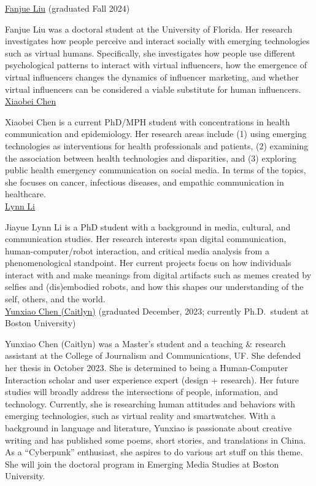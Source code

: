\documentclass[]{article}
\begin{document}
\href{https://www.fanjueliu.com/}{Fanjue Liu} (graduated Fall 2024)

Fanjue Liu was a doctoral student at the University of Florida. Her
research investigates how people perceive and interact socially with
emerging technologies such as virtual humans. Specifically, she
investigates how people use different psychological patterns to interact
with virtual influencers, how the emergence of virtual influencers
changes the dynamics of influencer marketing, and whether virtual
influencers can be considered a viable substitute for human
influencers.\\

\href{https://www.linkedin.com/in/xiaobei-chen/}{Xiaobei Chen}

Xiaobei Chen is a current PhD/MPH student with concentrations in health
communication and epidemiology. Her research areas include (1) using
emerging technologies as interventions for health professionals and
patients, (2) examining the association between health technologies and
disparities, and (3) exploring public health emergency communication on
social media. In terms of the topics, she focuses on cancer, infectious
diseases, and empathic communication in healthcare.\\

\href{https://www.jou.ufl.edu/staff/jiayue-lynn-li/}{Lynn Li}

Jiayue Lynn Li is a PhD student with a background in media, cultural,
and communication studies. Her research interests span digital
communication, human-computer/robot interaction, and critical media
analysis from a phenomenological standpoint. Her current projects focus
on how individuals interact with and make meanings from digital
artifacts such as memes created by selfies and (dis)embodied robots, and
how this shapes our understanding of the self, others, and the world.\\

\href{https://www.linkedin.com/in/yunxiao-caitlyn-chen-133413178/}{Yunxiao
Chen (Caitlyn)} (graduated December, 2023; currently Ph.D.~student at
Boston University)

Yunxiao Chen (Caitlyn) was a Master's student and a teaching \& research
assistant at the College of Journalism and Communications, UF. She
defended her thesis in October 2023. She is determined to being a
Human-Computer Interaction scholar and user experience expert (design +
research). Her future studies will broadly address the intersections of
people, information, and technology. Currently, she is researching human
attitudes and behaviors with emerging technologies, such as virtual
reality and smartwatches. With a background in language and literature,
Yunxiao is passionate about creative writing and has published some
poems, short stories, and translations in China. As a ``Cyberpunk''
enthusiast, she aspires to do various art stuff on this theme. She will
join the doctoral program in Emerging Media Studies at Boston
University.\\
\end{document}
